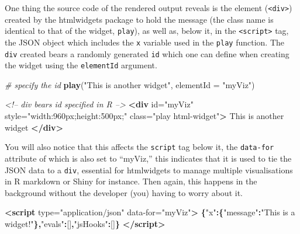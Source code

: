 \documentclass[10pt,]{krantz}
\makeatletter
\newenvironment{Shaded}{\begin{snugshade}}{\end{snugshade}}
\newcommand{\CommentTok}[1]{\textcolor[rgb]{0.37,0.37,0.37}{\textit{#1}}}
\newcommand{\DataTypeTok}[1]{\textcolor[rgb]{0.27,0.27,0.27}{#1}}
\newcommand{\KeywordTok}[1]{\textcolor[rgb]{0.27,0.27,0.27}{\textbf{#1}}}
\newcommand{\NormalTok}[1]{#1}
\newcommand{\OperatorTok}[1]{\textcolor[rgb]{0.43,0.43,0.43}{\textbf{#1}}}
\newcommand{\OtherTok}[1]{\textcolor[rgb]{0.37,0.37,0.37}{#1}}
\newcommand{\StringTok}[1]{\textcolor[rgb]{0.5,0.5,0.5}{#1}}
\newenvironment{kframe}{%
\medskip{}
\setlength{\fboxsep}{.8em}
 \def\at@end@of@kframe{}%
 \ifinner\ifhmode%
  \def\at@end@of@kframe{\end{minipage}}%
  \begin{minipage}{\columnwidth}%
 \fi\fi%
 \def\FrameCommand##1{\hskip\@totalleftmargin \hskip-\fboxsep
 \colorbox{shadecolor}{##1}\hskip-\fboxsep
     \hskip-\linewidth \hskip-\@totalleftmargin \hskip\columnwidth}%
 \MakeFramed {\advance\hsize-\width
   \@totalleftmargin\z@ \linewidth\hsize
   \@setminipage}}%
 {\par\unskip\endMakeFramed%
 \at@end@of@kframe}
\renewenvironment{Shaded}{\begin{kframe}}{\end{kframe}}
\makeatother
\begin{document}
One thing the source code of the rendered output reveals is the element (\texttt{\textless{}div\textgreater{}}) created by the htmlwidgets package to hold the message (the class name is identical to that of the widget, \texttt{play}), as well as, below it, in the \texttt{\textless{}script\textgreater{}} tag, the JSON object which includes the \texttt{x} variable used in the \texttt{play} function. The \texttt{div} created bears a randomly generated \texttt{id} which one can define when creating the widget using the \texttt{elementId} argument.

\begin{Shaded}
\begin{Highlighting}[]
\CommentTok{# specify the id}
\KeywordTok{play}\NormalTok{(}\StringTok{"This is another widget"}\NormalTok{, }\DataTypeTok{elementId =} \StringTok{"myViz"}\NormalTok{)}
\end{Highlighting}
\end{Shaded}

\begin{Shaded}
\begin{Highlighting}[]
\CommentTok{<!-- div bears id specified in R -->}
\KeywordTok{<div}\OtherTok{ id=}\StringTok{"myViz"} 
\OtherTok{  style=}\StringTok{"width:960px;height:500px;"} 
\OtherTok{  class=}\StringTok{"play html-widget"}\KeywordTok{>}
\NormalTok{  This is another widget}
\KeywordTok{</div>}
\end{Highlighting}
\end{Shaded}

You will also notice that this affects the \texttt{script} tag below it, the \texttt{data-for} attribute of which is also set to ``myViz,'' this indicates that it is used to tie the JSON data to a \texttt{div}, essential for htmlwidgets to manage multiple visualisations in R markdown or Shiny for instance. Then again, this happens in the background without the developer (you) having to worry about it.

\begin{Shaded}
\begin{Highlighting}[]
\KeywordTok{<script}\OtherTok{ type=}\StringTok{"application/json"} 
\OtherTok{  data-for=}\StringTok{"myViz"}\KeywordTok{>}
  \OperatorTok{\{}\StringTok{"x"}\OperatorTok{:\{}\StringTok{"message"}\OperatorTok{:}\StringTok{"This is a widget!"}\OperatorTok{\},}\StringTok{"evals"}\OperatorTok{:}\NormalTok{[]}\OperatorTok{,}\StringTok{"jsHooks"}\OperatorTok{:}\NormalTok{[]}\OperatorTok{\}}
\KeywordTok{</script>}
\end{Highlighting}
\end{Shaded}
\end{document}
